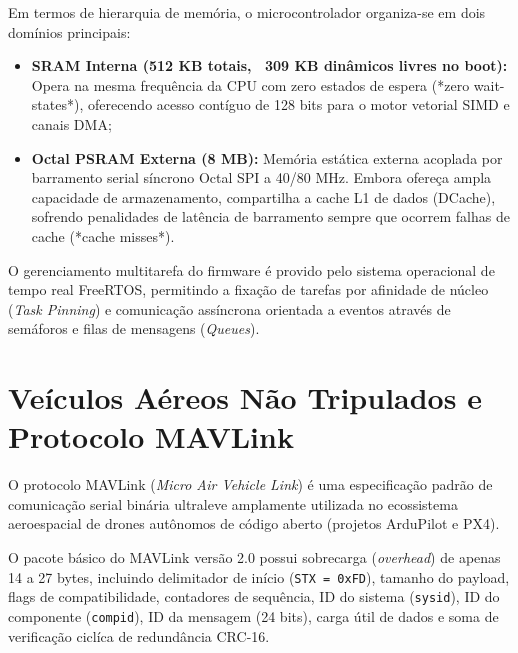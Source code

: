Em termos de hierarquia de memória, o microcontrolador organiza-se em dois domínios principais:
\begin{itemize}
    \item \textbf{SRAM Interna (512 KB totais, ~309 KB dinâmicos livres no boot):} Opera na mesma frequência da CPU com zero estados de espera (*zero wait-states*), oferecendo acesso contíguo de 128 bits para o motor vetorial SIMD e canais DMA;
    \item \textbf{Octal PSRAM Externa (8 MB):} Memória estática externa acoplada por barramento serial síncrono Octal SPI a 40/80 MHz. Embora ofereça ampla capacidade de armazenamento, compartilha a cache L1 de dados (DCache), sofrendo penalidades de latência de barramento sempre que ocorrem falhas de cache (*cache misses*).
\end{itemize}

O gerenciamento multitarefa do firmware é provido pelo sistema operacional de tempo real FreeRTOS, permitindo a fixação de tarefas por afinidade de núcleo (\textit{Task Pinning}) e comunicação assíncrona orientada a eventos através de semáforos e filas de mensagens (\textit{Queues}).

\section{Veículos Aéreos Não Tripulados e Protocolo MAVLink}

O protocolo MAVLink (\textit{Micro Air Vehicle Link}) \cite{koubaa2019mavlink} é uma especificação padrão de comunicação serial binária ultraleve amplamente utilizada no ecossistema aeroespacial de drones autônomos de código aberto (projetos ArduPilot e PX4). 

O pacote básico do MAVLink versão 2.0 possui sobrecarga (\textit{overhead}) de apenas 14 a 27 bytes, incluindo delimitador de início (\texttt{STX = 0xFD}), tamanho do payload, flags de compatibilidade, contadores de sequência, ID do sistema (\texttt{sysid}), ID do componente (\texttt{compid}), ID da mensagem (24 bits), carga útil de dados e soma de verificação ciclíca de redundância CRC-16.

